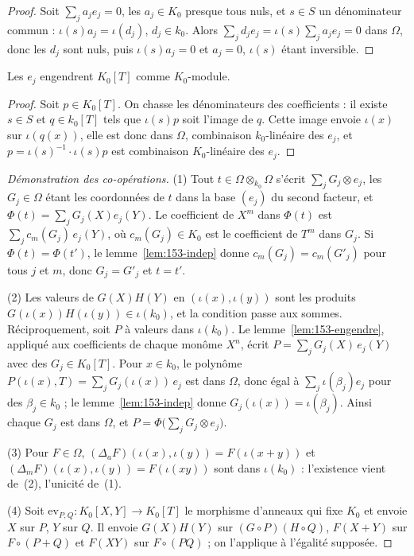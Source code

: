 \begin{proof}
Soit $\sum_j a_j e_j = 0$, les $a_j \in K_0$ presque tous nuls, et $s \in S$ un dénominateur commun : $\iota(s) a_j = \iota(d_j)$, $d_j \in k_0$. Alors $\sum_j d_j e_j = \iota(s) \sum_j a_j e_j = 0$ dans $\Omega$, donc les $d_j$ sont nuls, puis $\iota(s) a_j = 0$ et $a_j = 0$, $\iota(s)$ étant inversible.
\end{proof}

\begin{lemme}\label{lem:153-engendre}
Les $e_j$ engendrent $K_0[T]$ comme $K_0$-module.
\end{lemme}

\begin{proof}
Soit $p \in K_0[T]$. On chasse les dénominateurs des coefficients : il existe $s \in S$ et $q \in k_0[T]$ tels que $\iota(s) p$ soit l'image de $q$. Cette image envoie $\iota(x)$ sur $\iota(q(x))$, elle est donc dans $\Omega$, combinaison $k_0$-linéaire des $e_j$, et $p = \iota(s)^{-1} \cdot \iota(s) p$ est combinaison $K_0$-linéaire des $e_j$.
\end{proof}

\begin{proof}[Démonstration des co-opérations]
(1) Tout $t \in \Omega \otimes_{k_0} \Omega$ s'écrit $\sum_j G_j \otimes e_j$, les $G_j \in \Omega$ étant les coordonnées de $t$ dans la base $(e_j)$ du second facteur, et $\Phi(t) = \sum_j G_j(X) e_j(Y)$. Le coefficient de $X^m$ dans $\Phi(t)$ est $\sum_j c_m(G_j)\, e_j(Y)$, où $c_m(G_j) \in K_0$ est le coefficient de $T^m$ dans $G_j$. Si $\Phi(t) = \Phi(t')$, le lemme~\ref{lem:153-indep} donne $c_m(G_j) = c_m(G'_j)$ pour tous $j$ et $m$, donc $G_j = G'_j$ et $t = t'$.

(2) Les valeurs de $G(X) H(Y)$ en $(\iota(x), \iota(y))$ sont les produits $G(\iota(x)) H(\iota(y)) \in \iota(k_0)$, et la condition passe aux sommes. Réciproquement, soit $P$ à valeurs dans $\iota(k_0)$. Le lemme~\ref{lem:153-engendre}, appliqué aux coefficients de chaque monôme $X^n$, écrit $P = \sum_j G_j(X)\, e_j(Y)$ avec des $G_j \in K_0[T]$. Pour $x \in k_0$, le polynôme $P(\iota(x), T) = \sum_j G_j(\iota(x))\, e_j$ est dans $\Omega$, donc égal à $\sum_j \iota(\beta_j) e_j$ pour des $\beta_j \in k_0$ ; le lemme~\ref{lem:153-indep} donne $G_j(\iota(x)) = \iota(\beta_j)$. Ainsi chaque $G_j$ est dans $\Omega$, et $P = \Phi\bigl(\sum_j G_j \otimes e_j\bigr)$.

(3) Pour $F \in \Omega$, $(\Delta_a F)(\iota(x), \iota(y)) = F(\iota(x + y))$ et $(\Delta_m F)(\iota(x), \iota(y)) = F(\iota(xy))$ sont dans $\iota(k_0)$ : l'existence vient de~(2), l'unicité de~(1).

(4) Soit $\mathrm{ev}_{P,Q} : K_0[X, Y] \to K_0[T]$ le morphisme d'anneaux qui fixe $K_0$ et envoie $X$ sur $P$, $Y$ sur $Q$. Il envoie $G(X) H(Y)$ sur $(G \circ P)(H \circ Q)$, $F(X + Y)$ sur $F \circ (P + Q)$ et $F(XY)$ sur $F \circ (PQ)$ ; on l'applique à l'égalité supposée.
\end{proof}

